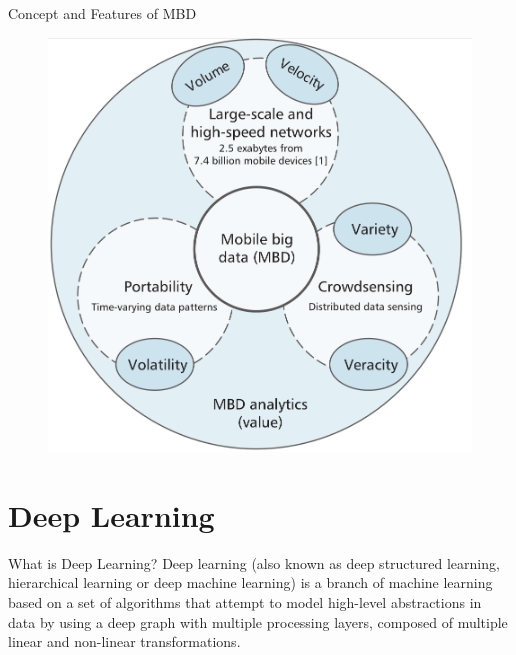 \documentclass[newPxFont]{beamer}
\begin{document}
\begin{frame}[c, allowframebreaks]{Concept and Features of MBD}
    \vspace{3em}
    
    \begin{figure}
		\centering
		\includegraphics[width=0.6\linewidth]{resources/mbd_structure.png}
        \label{fig:mbdEra}
	\end{figure}
    
    \vspace{3em}
 

\end{frame}

\section{Deep Learning}
\begin{frame}[c]{What is Deep Learning?}
\alert{Deep learning} (also known as deep structured learning, hierarchical learning or deep machine learning) is a branch of machine learning based on a set of algorithms that attempt to model high-level abstractions in data by using a deep graph with multiple processing layers, composed of multiple linear and non-linear transformations.

\end{frame}
\end{document}

